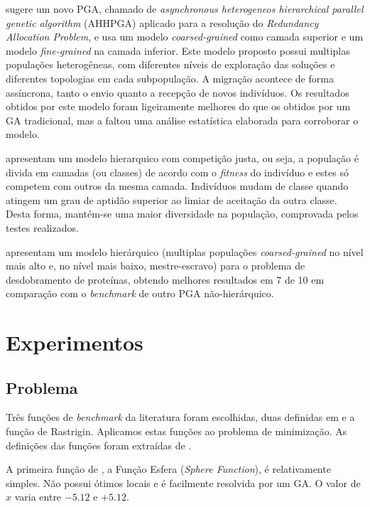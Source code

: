 \documentclass[12pt]{article}
\begin{document}
 \cite{zeng2007} sugere um novo PGA, chamado de \emph{asynchronous heterogeneos hierarchical parallel genetic algorithm} (AHHPGA) aplicado para a resolução do \emph{Redundancy Allocation Problem}, e usa um modelo \emph{coarsed-grained} como camada superior e um modelo \emph{fine-grained} na camada inferior. Este modelo proposto possui multiplas populações heterogêneas, com diferentes níveis de exploração das soluções e diferentes topologias em cada subpopulação. A migração acontece de forma assíncrona, tanto o envio quanto a recepção de novos indivíduos. Os resultados obtidos por este modelo foram ligeiramente melhores do que os obtidos por um GA tradicional, mas a faltou uma análise estatística elaborada para corroborar o modelo. 

\cite{heesung2009} apresentam um modelo hierarquico com competição justa, ou seja, a população é divida em camadas (ou classes) de acordo com o \emph{fitness} do indivíduo e estes só competem com outros da mesma camada. Indivíduos mudam de classe quando atingem um grau de aptidão superior ao limiar de aceitação da outra classe. Desta forma, mantém-se uma maior diversidade na população, comprovada pelos testes realizados.

 \cite{benitez2010} apresentam um modelo hierárquico (multiplas populações \emph{coarsed-grained} no nível mais alto e, no nível mais baixo, mestre-escravo) para o problema de desdobramento de proteínas, obtendo melhores resultados em 7 de 10 em comparação com o \emph{benchmark} de outro PGA não-hierárquico.


\section{Experimentos} %
\label{sec:experimentos}

\subsection{Problema} %
\label{sub:problema}

Três funções de \emph{benchmark} da literatura foram escolhidas, duas definidas em \cite{dejong1975} e a função de Rastrigin. Aplicamos estas funções ao problema de minimização. As definições das funções foram extraídas de \cite{luke2005}.

A primeira função de \cite{dejong1975}, a Função Esfera (\emph{Sphere Function}), é relativamente simples. Não possui ótimos locais e é facilmente resolvida por um GA. O valor de $x$ varia entre $-5.12$ e $+5.12$.
\end{document}
